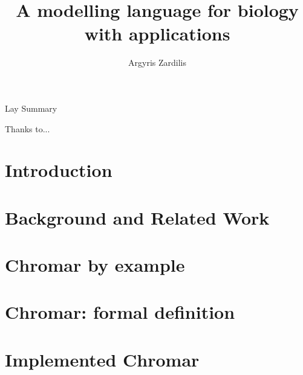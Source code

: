 \documentclass[phd, logo, twoside]{infthesis}
\title{A modelling language for biology with applications}
\author{Argyris Zardilis}
\begin{document}
\begin{preliminary}

  \maketitle

\begin{frontenv}{Lay Summary}{\LARGE}
    
\end{frontenv}\newpage

  \begin{acknowledgements}
Thanks to...
    \end{acknowledgements}

\standarddeclaration


\tableofcontents


\end{preliminary}

\chapter{Introduction}
\label{chp:intro}


\chapter{Background and Related Work}
\label{chp:relWork}


\chapter{Chromar by example}
\label{chp:chromarEx}


\chapter{Chromar: formal definition}
\label{chp:chromarForm}


\chapter{Implemented Chromar}
\label{chp:chromarImpl}

\end{document}
